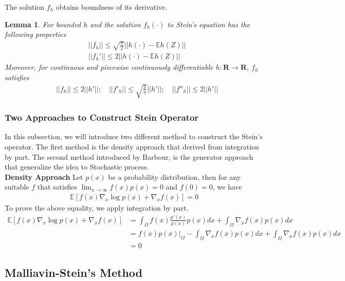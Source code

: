 \documentclass[11pt,english]{smfart}
\newtheorem{lemma}[theorem]{Lemma}
\newcommand{\mb}{\mathbb}
\newcommand{\mf}{\mathbf}
\begin{document}
The solution $f_h$ obtains boundness of its derivative. \\
\begin{lemma}
    For bounded $h$ and the solution $f_h(\cdot)$ to Stein's equation has the following properties
    \begin{align*}
        & ||f_h|| \leq \sqrt{\frac{\pi}{2}} ||h(\cdot) -\mb{E}h(Z) ||\\
        & ||f_h'|| \leq 2||h(\cdot) - \mb{E}h(Z)||
    \end{align*}
    Moreover, for continuous and piecewise continuously differentiable $h:\mf{R}\rightarrow \mf{R}$, $f_h$ satisfies 
    \begin{align*}
       & ||f_h|| \leq 2||h'|| ;\quad ||f'_h|| \leq \sqrt{\frac{2}{\pi}} ||h'||; \quad ||f''_h|| \leq 2||h'||
    \end{align*}
\end{lemma}

\subsubsection{Two Approaches to Construct Stein Operator}
In this subsection, we will introduce two different method to construct the Stein's operator. The first method is the density approach that derived from integration by part. The second method introduced by Barbour, is the generator approach that generalize the idea to Stochastic process. \\
\textbf{Density Approach} Let $p(x)$ be a probability distribution, then for any suitable $f$ that satisfies $\lim_{x\rightarrow \infty} f(x)p(x) = 0$ and $f(0)=0$, we have 
\begin{align}
    \mb{E}\left[f(x)\nabla_x \log p(x) + \nabla_x f(x)\right] = 0 
\end{align}
To prove the above equality, we apply integration by part. \begin{align*}
    \mb{E}\left[f(x)\nabla_x \log p(x) + \nabla_x f(x)\right]&=  \int_\Omega f(x) \frac{p'(x)}{p(x)} p(x)dx + \int_\Omega \nabla_x f(x) p(x) dx\\ 
    & = f(x)p(x)|_\Omega - \int_\Omega \nabla_x f(x)  p(x) dx +\int_\Omega \nabla_x f(x) p(x) dx\\
    & = 0
\end{align*}



\subsection{Malliavin-Stein's Method}
\end{document}
